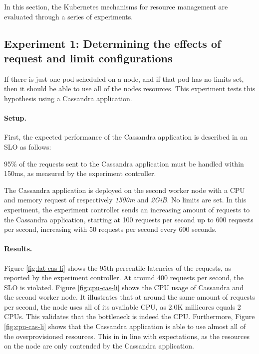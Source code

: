 In this section, the Kubernetes mechanisms for resource management are evaluated through a series of experiments. 

\subsection{Experiment 1: Determining the effects of request and limit configurations}
If there is just one pod scheduled on a node, and if that pod has no limits set, then it should be able to use all of the nodes resources. This experiment tests this hypothesis using a Cassandra application.

\paragraph{Setup.}
First, the expected performance of the Cassandra application is described in an SLO as follows:

\begin{slo}
95\% of the requests sent to the Cassandra application must be handled within 150ms, as measured by the experiment controller.
\end{slo}

The Cassandra application is deployed on the second worker node with a CPU and memory request of respectively \textit{1500m} and \textit{2GiB}. No limits are set. In this experiment, the experiment controller sends an increasing amount of requests to the Cassandra application, starting at 100 requests per second up to 600 requests per second, increasing with 50 requests per second every 600 seconds. 

\paragraph{Results.}
Figure \ref{fig:lat-cas-li} shows the 95th percentile latencies of the requests, as reported by the experiment controller. At around 400 requests per second, the SLO is violated. Figure \ref{fig:cpu-cas-li} shows the CPU usage of Cassandra and the second worker node. It illustrates that at around the same amount of requests per second, the node uses all of its available CPU, as 2.0K millicores equals 2 CPUs. This validates that the bottleneck is indeed the CPU. Furthermore, Figure \ref{fig:cpu-cas-li} shows that the Cassandra application is able to use almost all of the overprovisioned resources. This in in line with expectations, as the resources on the node are only contended by the Cassandra application.

